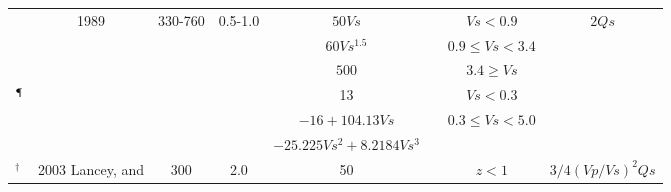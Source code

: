 \begin{table}[]
{\begin{tabular}{lccccccc}
\multirow{3}{*}{\citet{aagaard2008ground}}            & \multirow{3}{*}{1989}   & \multirow{3}{*}{330-760} & \multirow{3}{*}{0.5-1.0}      & $50 Vs$                                                  &                                     & $Vs  < 0.9$                       & \multirow{6}{*}{$2Qs$}                            \\
                                                                               &                                     &                                     &                                               & $60 Vs^{1.5}$                                         &                                     & $0.9 \leq Vs<3.4$                &                                                 \\
                                                                               &                                     &                                     &                                               & $500$                                                     &                                     & $3.4 \geq Vs$                       &                                                 \\ \cline{5-7}
\multirow{3}{*}{\citet{brocher2008compressional}$^\mathparagraph$} &                                     &                                     &                                               & 13                                                          &                                     & $Vs <0.3$                              &                                                 \\
                                                                               &                                     &                                     &                                               & $-16+104.13 Vs$                                   &                                     & \multirow{2}{*}{$0.3\leq Vs < 5.0$}   &                                                 \\
                                                                               &                                     &                                     &                                               & $-25.225Vs^2+8.2184Vs^3$                  &                                     &                                               &                                                 \\ \hline
\citet{chaljub2010quantitative}$^\dagger$                              & 2003 Lancey, and         & \multirow{2}{*}{300}     & \multirow{2}{*}{2.0}                & 50                                                           &                                     & $z<1$                                   & $3/4(Vp/Vs)^2Qs$                    \\

\end{tabular}}
\end{table}
